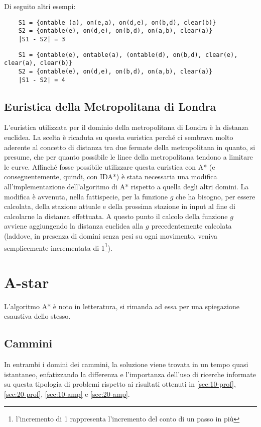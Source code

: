 Di seguito altri esempi:
\begin{lstlisting}
	S1 = {ontable (a), on(e,a), on(d,e), on(b,d), clear(b)}
	S2 = {ontable(e), on(d,e), on(b,d), on(a,b), clear(a)}
	|S1 - S2| = 3
\end{lstlisting}

\begin{lstlisting}
	S1 = {ontable(e), ontable(a), (ontable(d), on(b,d), clear(e), clear(a), clear(b)}
	S2 = {ontable(e), on(d,e), on(b,d), on(a,b), clear(a)}
	|S1 - S2| = 4
\end{lstlisting}

\subsection{Euristica della Metropolitana di Londra} \label{sec:eur-tube}
L'euristica utilizzata per il dominio della metropolitana di Londra è la distanza euclidea. La scelta è ricaduta su questa euristica perché ci sembrava molto aderente al concetto di distanza tra due fermate della metropolitana in quanto, si presume, che per quanto possibile le linee della metropolitana tendono a limitare le curve. Affinché fosse possibile utilizzare questa euristica con A* (e conseguentemente, quindi, con IDA*) è stata necessaria una modifica all'implementazione dell'algoritmo di A* rispetto a quella degli altri domini. La modifica è avvenuta, nella fattispecie, per la funzione $g$ che ha bisogno, per essere calcolata, della stazione attuale e della prossima stazione in input al fine di calcolarne la distanza effettuata. A questo punto il calcolo della funzione $g$ avviene aggiungendo la distanza euclidea alla $g$ precedentemente calcolata (laddove, in presenza di domini senza pesi su ogni movimento, veniva semplicemente incrementata di 1\footnote{l'incremento di 1 rappresenta l'incremento del conto di un passo in più}).


\section{A-star} \label{sec:astar}
L'algoritmo A* è noto in letteratura, si rimanda ad essa per una spiegazione esaustiva dello stesso.

\subsection{Cammini} \label{sec:astar-cammini}
In entrambi i domini dei cammini, la soluzione viene trovata in un tempo quasi istantaneo, enfatizzando la differenza e l'importanza dell'uso di ricerche informate su questa tipologia di problemi rispetto ai risultati ottenuti in \ref{sec:10-prof}, \ref{sec:20-prof}, \ref{sec:10-amp} e \ref{sec:20-amp}.

